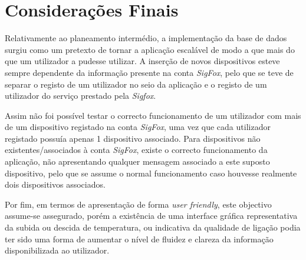 \documentclass[a4paper]{article}
\begin{document}
\pagebreak
\section{Considerações Finais}

Relativamente ao planeamento intermédio, a implementação da base de dados surgiu como um pretexto de tornar a aplicação escalável de modo a que mais do que um utilizador a pudesse utilizar. 
A inserção de novos dispositivos esteve sempre dependente da informação presente na conta \textit{SigFox}, pelo que se teve de separar o registo de um utilizador no seio da aplicação e o registo de um utilizador do serviço prestado pela \textit{Sigfox}.

Assim não foi possível testar o correcto funcionamento de um utilizador com mais de um dispositivo registado na conta \textit{SigFox}, uma vez que cada utilizador registado possuía apenas 1 dispositivo associado. Para dispositivos não existentes/associados à conta \textit{SigFox}, existe o correcto funcionamento da aplicação, não apresentando qualquer mensagem associado a este suposto dispositivo, pelo que se assume o normal funcionamento caso houvesse realmente dois dispositivos associados.

Por fim, em termos de apresentação de forma \textit{user friendly}, este objectivo assume-se assegurado, porém a existência de uma interface gráfica representativa da subida ou descida de temperatura, ou indicativa da qualidade de ligação podia ter sido uma forma de aumentar o nível de fluidez e clareza da informação disponibilizada ao utilizador.
\end{document}
